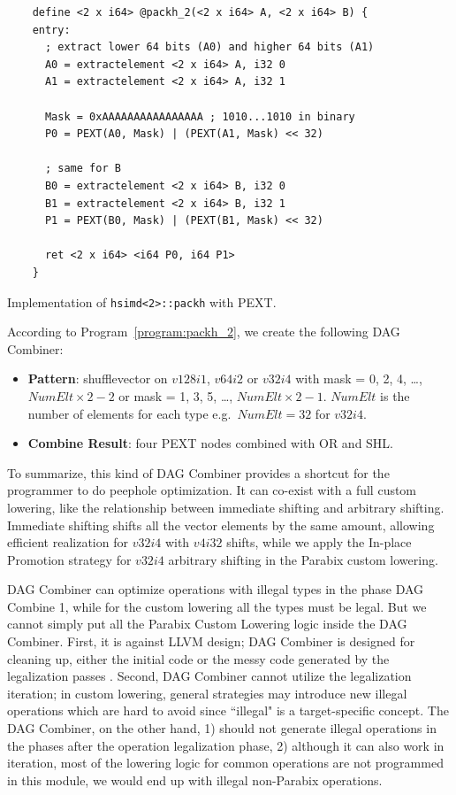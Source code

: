 \begin{program}[htbp!]
\begin{verbatim}
    define <2 x i64> @packh_2(<2 x i64> A, <2 x i64> B) {
    entry:
      ; extract lower 64 bits (A0) and higher 64 bits (A1)
      A0 = extractelement <2 x i64> A, i32 0
      A1 = extractelement <2 x i64> A, i32 1

      Mask = 0xAAAAAAAAAAAAAAAA ; 1010...1010 in binary
      P0 = PEXT(A0, Mask) | (PEXT(A1, Mask) << 32)

      ; same for B
      B0 = extractelement <2 x i64> B, i32 0
      B1 = extractelement <2 x i64> B, i32 1
      P1 = PEXT(B0, Mask) | (PEXT(B1, Mask) << 32)

      ret <2 x i64> <i64 P0, i64 P1>
    }
\end{verbatim}
\caption{Implementation of {\tt hsimd<2>::packh} with PEXT.}
\label{program:packh_2}
\end{program}

According to Program~\ref{program:packh_2}, we create the following DAG Combiner:
\begin{itemize}
    \item \textbf{Pattern}: shufflevector on $v128i1$, $v64i2$ or $v32i4$ with mask = 0, 2, 4, \ldots, $NumElt \times 2-2$ or mask = 1, 3, 5, \ldots, $NumElt \times 2 -1$. $NumElt$ is the number of elements for each type e.g.\ $NumElt=32$ for $v32i4$.
    \item \textbf{Combine Result}: four PEXT nodes combined with OR and SHL.
\end{itemize}

To summarize, this kind of DAG Combiner provides a shortcut for the programmer to do peephole optimization. It can co-exist with a full custom lowering, like the relationship between immediate shifting and arbitrary shifting. Immediate shifting shifts all the vector elements by the same amount, allowing efficient realization for $v32i4$ with $v4i32$ shifts, while we apply the In-place Promotion strategy for $v32i4$ arbitrary shifting in the Parabix custom lowering.

DAG Combiner can optimize operations with illegal types in the phase DAG Combine 1, while for the custom lowering all the types must be legal. But we cannot simply put all the Parabix Custom Lowering logic inside the DAG Combiner. First, it is against LLVM design; DAG Combiner is designed for cleaning up, either the initial code or the messy code generated by the legalization passes \cite{llvm_code_gen}. Second, DAG Combiner cannot utilize the legalization iteration; in custom lowering, general strategies may introduce new illegal operations which are hard to avoid since ``illegal" is a target-specific concept. The DAG Combiner, on the other hand, 1) should not generate illegal operations in the phases after the operation legalization phase, 2) although it can also work in iteration, most of the lowering logic for common operations are not programmed in this module, we would end up with illegal non-Parabix operations.

